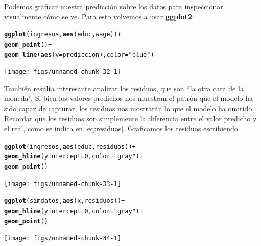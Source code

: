\documentclass{report}\usepackage[]{graphicx}\usepackage[]{color}
\makeatletter
\newcommand{\hlnum}[1]{\textcolor[rgb]{0.686,0.059,0.569}{#1}}%
\newcommand{\hlstr}[1]{\textcolor[rgb]{0.192,0.494,0.8}{#1}}%
\newcommand{\hlopt}[1]{\textcolor[rgb]{0,0,0}{#1}}%
\newcommand{\hlstd}[1]{\textcolor[rgb]{0.345,0.345,0.345}{#1}}%
\newcommand{\hlkwc}[1]{\textcolor[rgb]{0.333,0.667,0.333}{#1}}%
\newcommand{\hlkwd}[1]{\textcolor[rgb]{0.737,0.353,0.396}{\textbf{#1}}}%
\newenvironment{kframe}{%
 \def\at@end@of@kframe{}%
 \ifinner\ifhmode%
  \def\at@end@of@kframe{\end{minipage}}%
  \begin{minipage}{\columnwidth}%
 \fi\fi%
 \def\FrameCommand##1{\hskip\@totalleftmargin \hskip-\fboxsep
 \colorbox{shadecolor}{##1}\hskip-\fboxsep
     \hskip-\linewidth \hskip-\@totalleftmargin \hskip\columnwidth}%
 \MakeFramed {\advance\hsize-\width
   \@totalleftmargin\z@ \linewidth\hsize
   \@setminipage}}%
 {\par\unskip\endMakeFramed%
 \at@end@of@kframe}
\newenvironment{knitrout}{}{} %
\newcommand*{\paq}[1]{\textbf{#1}\index{#1@\textbf{#1}}}
\makeatother
\begin{document}
Podemos graficar nuestra predicción sobre los datos para inspeccionar visualmente cómo se ve. Para esto volvemos a usar \paq{ggplot2}:
\begin{knitrout}
\color{fgcolor}\begin{kframe}
\begin{alltt}
\hlkwd{ggplot}\hlstd{(ingresos,} \hlkwd{aes}\hlstd{(educ, wage))} \hlopt{+}
  \hlkwd{geom_point}\hlstd{()} \hlopt{+}
  \hlkwd{geom_line}\hlstd{(}\hlkwd{aes}\hlstd{(}\hlkwc{y} \hlstd{= prediccion),} \hlkwc{color} \hlstd{=} \hlstr{"blue"}\hlstd{)}
\end{alltt}
\end{kframe}

{\centering \texttt{[image: figs/unnamed-chunk-32-1]} 

}



\end{knitrout}

También resulta interesante analizar los residuos, que son ``la otra cara de la moneda''. Si bien los valores predichos nos muestran el patrón que el modelo ha sido capaz de capturar, los residuos nos mostrarán lo que el modelo ha omitido. Recordar que los residuos son simplemente la diferencia entre el valor predicho y el real, como se indica en \eqref{eq:residuos}. Graficamos los residuos escribiendo

\begin{knitrout}
\color{fgcolor}\begin{kframe}
\begin{alltt}
\hlkwd{ggplot}\hlstd{(ingresos,} \hlkwd{aes}\hlstd{(educ, residuos))} \hlopt{+}
  \hlkwd{geom_hline}\hlstd{(}\hlkwc{yintercept} \hlstd{=} \hlnum{0}\hlstd{,} \hlkwc{color} \hlstd{=} \hlstr{"gray"}\hlstd{)} \hlopt{+}
  \hlkwd{geom_point}\hlstd{()}
\end{alltt}
\end{kframe}

{\centering \texttt{[image: figs/unnamed-chunk-33-1]} 

}



\end{knitrout}

\begin{knitrout}
\color{fgcolor}\begin{kframe}
\begin{alltt}
\hlkwd{ggplot}\hlstd{(simdatos,} \hlkwd{aes}\hlstd{(x, residuos))} \hlopt{+}
  \hlkwd{geom_hline}\hlstd{(}\hlkwc{yintercept} \hlstd{=} \hlnum{0}\hlstd{,} \hlkwc{color} \hlstd{=} \hlstr{"gray"}\hlstd{)} \hlopt{+}
  \hlkwd{geom_point}\hlstd{()}
\end{alltt}
\end{kframe}

{\centering \texttt{[image: figs/unnamed-chunk-34-1]} 

}



\end{knitrout}
\end{document}
